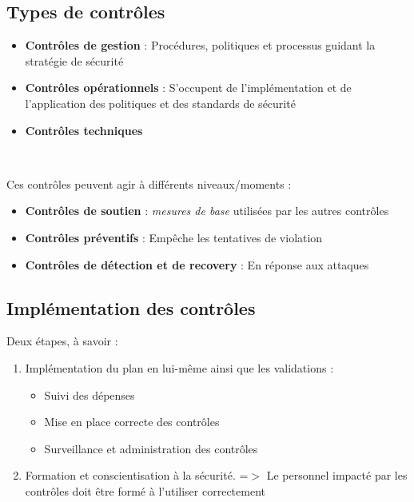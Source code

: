 \documentclass{report}
\begin{document}
\subsection{Types de contrôles}

\begin{itemize}
    \item \textbf{Contrôles de gestion} : Procédures, politiques et processus guidant la stratégie de sécurité

    \item \textbf{Contrôles opérationnels} : S'occupent de l'implémentation et de l'application des politiques et des standards de sécurité

    \item \textbf{Contrôles techniques}
\end{itemize}~

Ces contrôles peuvent agir à différents niveaux/moments :
\begin{itemize}
    \item \textbf{Contrôles de soutien} : \textit{mesures de base} utilisées par les autres contrôles

    \item \textbf{Contrôles préventifs} : Empêche les tentatives de violation

    \item \textbf{Contrôles de détection et de recovery} : En réponse aux attaques
\end{itemize}

\subsection{Implémentation des contrôles}

Deux étapes, à savoir :

\begin{enumerate}
    \item Implémentation du plan en lui-même ainsi que les validations :
    \begin{itemize}
        \item Suivi des dépenses
        \item Mise en place correcte des contrôles
        \item Surveillance et administration des contrôles
    \end{itemize}

    \item Formation et conscientisation à la sécurité. =$>$ Le personnel impacté par les contrôles doit être formé à l'utiliser correctement
\end{enumerate}
\end{document}
